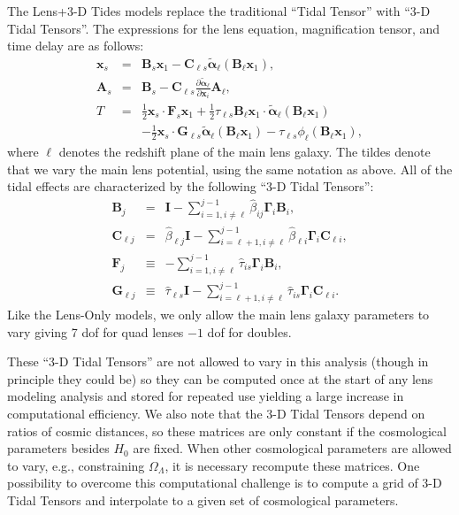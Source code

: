 \documentclass{emulateapj}
\newcommand\A[0]{\mathbf{A}}
\newcommand\B[0]{\mathbf{B}}
\newcommand\C[0]{\mathbf{C}}
\newcommand\I[0]{\mathbf{I}}
\newcommand\F[0]{\mathbf{F}}
\newcommand\G[0]{\mathbf{G}}
\newcommand\GammaMat[0]{\boldsymbol{\Gamma}}
\newcommand\x[0]{\mathbf{x}}
\newcommand\al[0]{\boldsymbol{\alpha}}
\newcommand\betahat{\hat{\beta}}
\newcommand\tauhat{\hat{\tau}}
\begin{document}
The Lens+3-D Tides models replace the traditional ``Tidal Tensor'' with ``3-D Tidal Tensors''. The expressions for the lens equation, magnification tensor, and time delay are as follows:
\begin{eqnarray}
\x_{s} &=& \B_s \x_1 - \C_{\ell s} \tilde{\al}_\ell(\B_\ell \x_1),\label{eqn:lenseqn_3dtide}\\
\A_{s} &=& \B_s - \C_{\ell s} \frac{\partial \tilde{\al}_\ell}{\partial \x_i} \A_\ell,\\
T &=& \frac{1}{2} \x_s \cdot \F_s \x_1 + \frac{1}{2}\tau_{\ell s} \B_\ell \x_1 \cdot \tilde{\al}_\ell(\B_\ell \x_1) \nonumber \\
&&-\frac{1}{2}\x_s \cdot \G_{\ell s}\tilde{\al}_\ell(\B_\ell \x_1) -\tau_{\ell s}\phi_\ell(\B_\ell \x_1),
\end{eqnarray}
where $\ell$ denotes the redshift plane of the main lens galaxy. The tildes denote that we vary the main lens potential, using the same notation as above.
All of the tidal effects are characterized by the following ``3-D Tidal Tensors'':
\begin{eqnarray}
\B_j &=& \I - \sum\limits_{i=1,i \neq \ell}^{j-1}\betahat_{i j}\GammaMat_i \B_i, \\
\C_{\ell j} &=& \betahat_{\ell j} \I - \sum\limits_{i=\ell+1, i\neq \ell}^{j-1} \betahat_{\ell i}\GammaMat_i\C_{\ell i}, \\
\F_j &\equiv& 
  - \sum\limits_{i=1,i\neq \ell}^{j-1} \tauhat_{is}\GammaMat_i\B_i, \\
\G_{\ell j}&\equiv& 
 \tauhat_{\ell s}\I- \sum\limits_{i=\ell+1,i \neq \ell}^{j-1} \tauhat_{is}\GammaMat_i\C_{\ell i}.
\end{eqnarray}
Like the Lens-Only models, we only allow the main lens galaxy parameters to vary giving 7 dof for quad lenses $-1$ dof for doubles.

These ``3-D Tidal Tensors'' are not allowed to vary in this analysis (though in principle they could be) so they can be computed once at the start of any lens modeling analysis and stored for repeated use yielding a large increase in computational efficiency. We also note that the 3-D Tidal Tensors depend on ratios of cosmic distances, so these matrices are only constant if the cosmological parameters besides $H_0$ are fixed. When other cosmological parameters are allowed to vary, e.g., constraining $\Omega_{\Lambda}$, it is necessary recompute these matrices. One possibility to overcome this computational challenge is to compute a grid of 3-D Tidal Tensors and interpolate to a given set of cosmological parameters.
\end{document}
